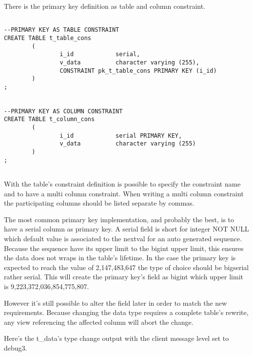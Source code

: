 There is the primary key definition as table and column constraint.\newpage

\begin{lstlisting}[style=pgsql]

--PRIMARY KEY AS TABLE CONSTRAINT
CREATE TABLE t_table_cons
        (
                i_id            serial,
                v_data          character varying (255),
                CONSTRAINT pk_t_table_cons PRIMARY KEY (i_id)
        )
;


--PRIMARY KEY AS COLUMN CONSTRAINT
CREATE TABLE t_column_cons
        (
                i_id            serial PRIMARY KEY,
                v_data          character varying (255)
        )
;
 

\end{lstlisting}

With the table's constraint definition is possible to specify the constraint name and to have a 
multi column constraint. When writing a multi column constraint the participating columns should be 
listed separate by commas.\newline

The most common primary key implementation, and probably the best, is to have a serial column as 
primary key. A serial field is short for integer NOT NULL which default value is associated to the 
nextval for an auto generated sequence. Because the sequence have its upper limit to the bigint 
upper limit, this ensures the data does not wraps in the table's lifetime. In the case the primary 
key is expected to reach the value of 2,147,483,647 the type of choice should be bigserial rather 
serial. This will create the primary key's field as bigint which upper limit is 
9,223,372,036,854,775,807.\newline

However it's still possible to alter the field later in order to match the new requirements. 
Because changing the data type requires a complete table's rewrite, any view referencing the 
affected column will abort the change. \newline 

Here's the t\_data's type change output with the client message level set to debug3.

